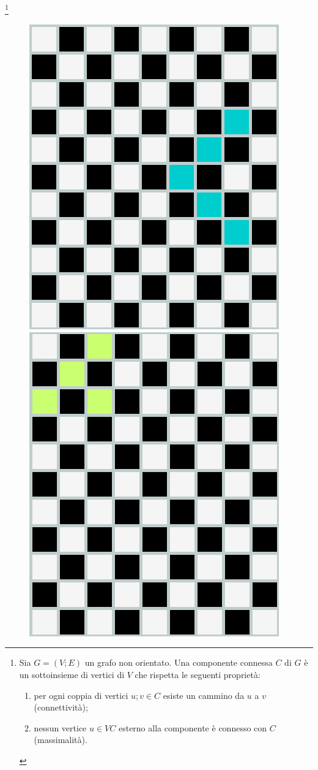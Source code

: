 \footnote{Sia $G = (V;E)$ un grafo non orientato. Una
componente connessa $C$ di $G$ è un sottoinsieme di vertici di $V$ che rispetta le seguenti proprietà:
\begin{enumerate}
	\item per ogni coppia di vertici $u;v \in C$ esiste un cammino da $u$ a $v$ (connettività);
	\item nessun vertice $u \in VC$ esterno alla componente è connesso con $C$ (massimalità).
\end{enumerate}
}\label{nota}
\clearpage

\begin{figure}[h]
	\centering
	{\includegraphics[scale=0.35]{immagini/goodCC}}
	\hspace{5mm}
	{\includegraphics[scale=0.35]{immagini/badCC}}

\end{figure}
